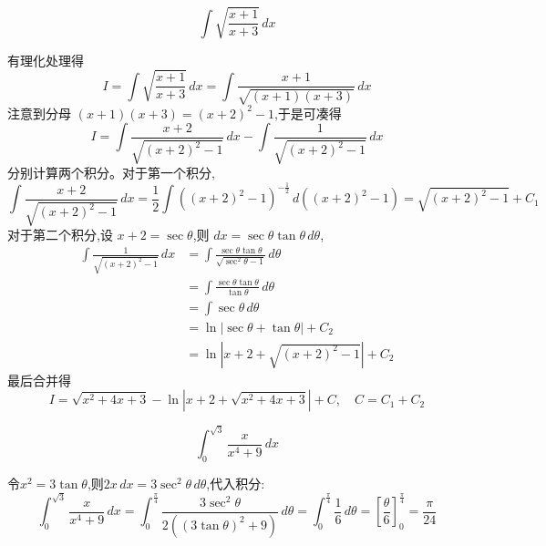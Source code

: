 \begin{questions}
    \question 
    \[ 
    \int \sqrt{\frac{x+1}{x+3}} \,dx 
    \]
    \begin{solution}
        有理化处理得
        \[
        I=\int \sqrt{\frac{x+1}{x+3}} \,dx = \int \frac{x+1}{\sqrt{(x+1)(x+3)}} \,dx
        \]
        注意到分母 $(x+1)(x+3) =(x+2)^2-1$,于是可凑得
        \[
        I = \int \frac{x+2}{\sqrt{(x+2)^2-1}} \,dx - \int \frac{1}{\sqrt{(x+2)^2-1}} \,dx
        \]
        分别计算两个积分。对于第一个积分,
        \[
        \int \frac{x+2}{\sqrt{(x+2)^2-1}} \,dx = \frac{1}{2} \int ((x+2)^2-1)^{-\frac{1}{2}} \,d((x+2)^2-1) = \sqrt{(x+2)^2-1} +C_1
        \]
        对于第二个积分,设 $x+2 = \sec \theta$,则 $dx = \sec \theta \tan \theta \, d\theta$,
        \begin{align*}
        \int \frac{1}{\sqrt{(x+2)^2-1}} \,dx &= \int \frac{\sec \theta \tan \theta}{\sqrt{\sec^2 \theta - 1}} \, d\theta \\
        &= \int \frac{\sec \theta \tan \theta}{\tan \theta} \, d\theta \\
        &= \int \sec \theta \, d\theta \\
        &= \ln|\sec \theta + \tan \theta| + C_2 \\
        &= \ln|x+2 + \sqrt{(x+2)^2-1}| + C_2
        \end{align*}
        最后合并得
        \[
        I = \sqrt{x^2+4x+3} - \ln|x+2 + \sqrt{x^2+4x+3}| + C,\quad C=C_1+C_2
        \]
    \end{solution}

    \question 
    \[
    \int_{0}^{\sqrt{3}} \frac{x}{x^4 + 9} \, dx
    \]
    \begin{solution}
        令$x^2 = 3 \tan \theta$,则$2x \, dx = 3 \sec^2 \theta \, d\theta$,代入积分:
        \[
        \int_{0}^{\sqrt{3}} \frac{x}{x^4 + 9} \, dx 
        = \int_{0}^{\frac{\pi}{4}} \frac{3 \sec^2 \theta}{2((3\tan\theta)^2 + 9)} \, d\theta
        = \int_{0}^{\frac{\pi}{4}} \frac{1}{6} \, d\theta 
        = \left[\frac{\theta}{6}\right]_0^{\frac{\pi}{4}} 
        = \frac{\pi}{24}
        \]
    \end{solution}


\end{questions}
